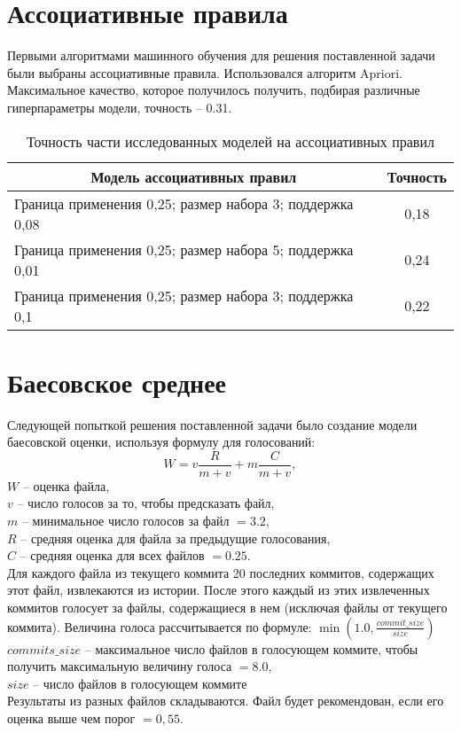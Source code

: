 \section{Ассоциативные правила}
Первыми алгоритмами машинного обучения для решения поставленной задачи были выбраны ассоциативные правила. Использовался алгоритм Apriori. Максимальное качество, которое получилось получить, подбирая различные гиперпараметры модели, точность -- 0.31. 
\begin{table}[!h]
\caption{Точность части исследованных моделей на ассоциативных правил}\label{ar-offline-result-table}
\centering
\begin{tabular}{|l|c|}\hline
\multicolumn{1}{|c|}{\textbf{Модель ассоциативных правил}} & \textbf{Точность}\\\hline
Граница применения 0,25; размер набора 3; поддержка 0,08 & 0,18\\\hline
Граница применения 0,25; размер набора 5; поддержка 0,01  & 0,24 \\\hline
Граница применения 0,25; размер набора 3; поддержка 0,1  & 0,22\\\hline
\end{tabular}
\end{table}
\section{Баесовское среднее}
Следующей попыткой решения поставленной задачи было создание модели баесовской оценки, используя формулу для голосований:
    $$W = v\frac{R}{m + v} + m\frac{C}{m + v},$$
$W$ -- оценка файла, \\
$v$ -- число голосов за то, чтобы предсказать файл, \\
$m$ -- минимальное число голосов за файл $= 3.2$, \\
$R$ -- средняя оценка для файла за предыдущие голосования, \\
${C}$ -- средняя оценка для всех файлов $= 0.25$. \\
Для каждого файла из текущего коммита 20 последних коммитов, содержащих этот файл, извлекаются из истории. После этого каждый из этих извлеченных коммитов голосует за файлы, содержащиеся в нем (исключая файлы от текущего коммита). Величина голоса рассчитывается по формуле: $\min(1.0, \frac{{commit\_size}}{{size}})$\\
$commits\_size$ --  максимальное число файлов в голосующем коммите, чтобы получить максимальную величину голоса $= 8.0$,\\
$size$ -- число файлов в голосующем коммите\\
Результаты из разных файлов складываются. Файл будет рекомендован, если его оценка выше чем порог $= 0,55$.
